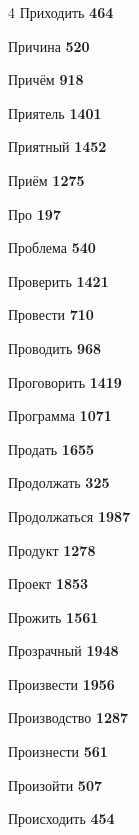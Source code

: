 \begin{multicols}{4}
\noindent Приходить \dotfill \textbf{\color{secondary} 464}\par
\noindent Причина \dotfill \textbf{\color{secondary} 520}\par
\noindent Причём \dotfill \textbf{\color{secondary} 918}\par
\noindent Приятель \dotfill \textbf{\color{secondary} 1401}\par
\noindent Приятный \dotfill \textbf{\color{secondary} 1452}\par
\noindent Приём \dotfill \textbf{\color{secondary} 1275}\par
\noindent Про \dotfill \textbf{\color{secondary} 197}\par
\noindent Проблема \dotfill \textbf{\color{secondary} 540}\par
\noindent Проверить \dotfill \textbf{\color{secondary} 1421}\par
\noindent Провести \dotfill \textbf{\color{secondary} 710}\par
\noindent Проводить \dotfill \textbf{\color{secondary} 968}\par
\noindent Проговорить \dotfill \textbf{\color{secondary} 1419}\par
\noindent Программа \dotfill \textbf{\color{secondary} 1071}\par
\noindent Продать \dotfill \textbf{\color{secondary} 1655}\par
\noindent Продолжать \dotfill \textbf{\color{secondary} 325}\par
\noindent Продолжаться \dotfill \textbf{\color{secondary} 1987}\par
\noindent Продукт \dotfill \textbf{\color{secondary} 1278}\par
\noindent Проект \dotfill \textbf{\color{secondary} 1853}\par
\noindent Прожить \dotfill \textbf{\color{secondary} 1561}\par
\noindent Прозрачный \dotfill \textbf{\color{secondary} 1948}\par
\noindent Произвести \dotfill \textbf{\color{secondary} 1956}\par
\noindent Производство \dotfill \textbf{\color{secondary} 1287}\par
\noindent Произнести \dotfill \textbf{\color{secondary} 561}\par
\noindent Произойти \dotfill \textbf{\color{secondary} 507}\par
\noindent Происходить \dotfill \textbf{\color{secondary} 454}\par

\end{multicols}
